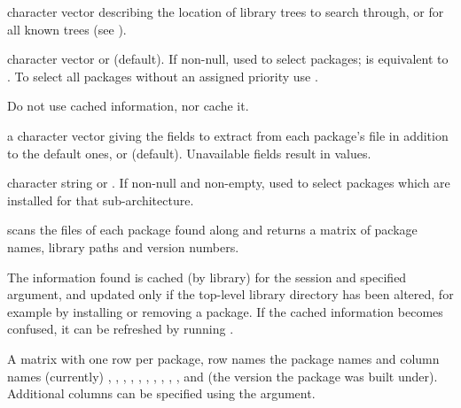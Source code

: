 %
\begin{Arguments}
\begin{ldescription}
\item[\code{lib.loc}] 
character vector describing the location of \R{} library trees to
search through, or  for all known trees
(see ).

\item[\code{priority}] 
character vector or  (default).  If non-null, used to
select packages;  is equivalent to
.  To select all packages without an
assigned priority use .

\item[\code{noCache}] Do not use cached information, nor cache it.

\item[\code{fields}] a character vector giving the fields to extract from
each package's  file in addition to the default
ones, or  (default).  Unavailable fields result in
 values.
\item[\code{subarch}] character string or .  If non-null and
non-empty, used to select packages which are installed for that
sub-architecture.

\end{ldescription}
\end{Arguments}
%
\begin{Details}\relax
{} scans the  files of each
package found along  and returns a matrix of package
names, library paths and version numbers.

The information found is cached (by library) for the \R{} session and
specified  argument, and updated only if the top-level
library directory has been altered, for example by installing or
removing a package.  If the cached information becomes confused, it
can be refreshed by running .
\end{Details}
%
\begin{Value}
A matrix with one row per package, row names the package names and
column names (currently)
, ,
, ,
, , ,
, ,
,  and
 (the \R{} version the package was built under).
Additional columns can be specified using the 
argument.
\end{Value}
